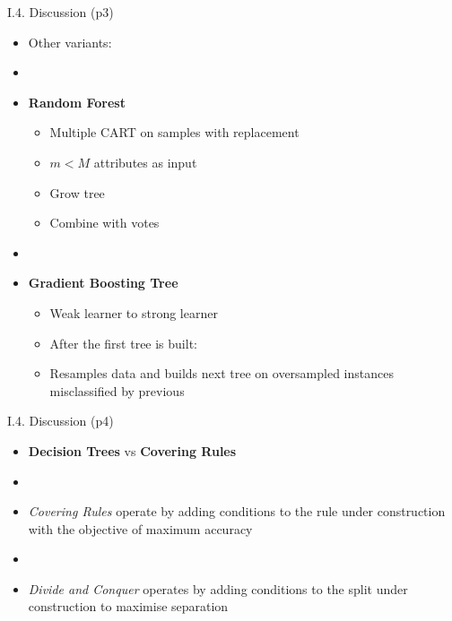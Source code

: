 \documentclass[handout]{beamer}
\newcommand{\strong}[1]{\textbf{\color{teal} #1}}
\newcommand{\stronger}[1]{\textbf{\color{purple} #1}}
\begin{document}
\begin{frame}{I.4. Discussion (p3)}
\begin{itemize}
\item[] Other variants:
\item[]
\item \stronger{Random Forest}~\cite{breiman:2001}
	\begin{itemize}
	\item Multiple CART on samples with replacement
	\item $m<M$ attributes as input
	\item Grow tree
	\item Combine with votes
	\end{itemize}
\item[]
\item \stronger{Gradient Boosting Tree}~\cite{friedman:1999}
	\begin{itemize}
	\item Weak learner to strong learner
	\item After the first tree is built:
	\item[] Resamples data and builds next tree on oversampled instances misclassified by previous
	\end{itemize}
\end{itemize}
\end{frame}
\begin{frame}{I.4. Discussion (p4)}
\begin{itemize}
\item[] \strong{Decision Trees} vs \strong{Covering Rules}
\item[]
\item \emph{Covering Rules} operate by adding conditions to the rule under construction with the objective of maximum accuracy
\item[]
\item \emph{Divide and Conquer} operates by adding conditions to the split under construction to maximise separation
\end{itemize}
\end{frame}


\end{document}
